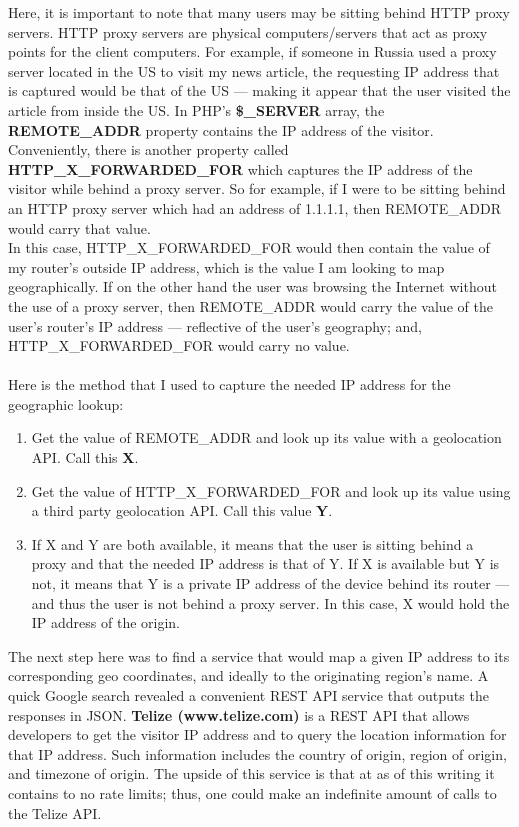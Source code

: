 \documentclass[12pt]{article}
\begin{document}
Here, it is important to note that many users may be sitting behind HTTP proxy servers. HTTP proxy servers are physical computers/servers that act as proxy points for the client computers. For example, if someone in Russia used a proxy server located in the US to visit my news article, the requesting IP address that is captured would be that of the US --- making it appear that the user visited the article from inside the US. In PHP's \textbf{\$\_SERVER} array, the \textbf{REMOTE\_ADDR} property contains the IP address of the visitor. Conveniently, there is another property called \textbf{HTTP\_X\_FORWARDED\_FOR} which captures the IP address of the visitor while behind a proxy server. So for example, if I were to be sitting behind an HTTP proxy server which had an address of 1.1.1.1, then REMOTE\_ADDR would carry that value. \\
In this case, HTTP\_X\_FORWARDED\_FOR would then contain the value of my router's outside IP address, which is the value I am looking to map geographically. If on the other hand the user was browsing the Internet without the use of a proxy server, then REMOTE\_ADDR would carry the value of the user's router's IP address --- reflective of the user's geography; and, HTTP\_X\_FORWARDED\_FOR would carry no value. \\ \\
\noindent Here is the method that I used to capture the needed IP address for the geographic lookup:
\begin{enumerate}
\item Get the value of REMOTE\_ADDR and look up its value with a geolocation API. Call this \textbf{X}.
\item Get the value of HTTP\_X\_FORWARDED\_FOR and look up its value using a third party geolocation API. Call this value \textbf{Y}.
\item If X and Y are both available, it means that the user is sitting behind a proxy and that the needed IP address is that of Y. If X is available but Y is not, it means that Y is a private IP address of the device behind its router --- and thus the user is not behind a proxy server. In this case, X would hold the IP address of the origin.
\end{enumerate} 

The next step here was to find a service that would map a given IP address to its corresponding geo coordinates, and ideally to the originating region's name. A quick Google search revealed a convenient REST API service that outputs the responses in JSON. \textbf{Telize (www.telize.com)} is a REST API that allows developers to get the visitor IP address and to query the location information for that IP address. Such information includes the country of origin, region of origin, and timezone of origin. The upside of this service is that at as of this writing it contains to no rate limits; thus, one could make an indefinite amount of calls to the Telize API.
\end{document}
